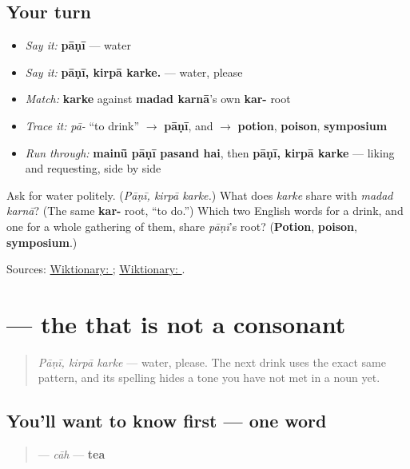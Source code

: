 \subsection*{Your turn}
\begin{itemize}
\raggedright
  \item \emph{Say it:} \textbf{pāṇī} — water
  \item \emph{Say it:} \textbf{pāṇī, kirpā karke.} — water, please
  \item \emph{Match:} \textbf{karke} against \textbf{madad karnā}'s own \textbf{kar-} root
  \item \emph{Trace it:} \emph{pā-} \textquotedblleft{}to drink\textquotedblright{} $\to$ \textbf{pāṇī}, and $\to$ \textbf{potion}, \textbf{poison}, \textbf{symposium}
  \item \emph{Run through:} \textbf{mainū̃ pāṇī pasand hai}, then \textbf{pāṇī, kirpā karke} — liking and requesting, side by side
\end{itemize}

\begin{tcolorbox}[breakable,colback=teal!4,colframe=teal!35!black,title={Before you move on}]
Ask for water politely. (\emph{Pāṇī, kirpā karke.}) What does \emph{karke} share with \emph{madad karnā}? (The same \textbf{kar-} root, \textquotedblleft{}to do.\textquotedblright{}) Which two English words for a drink, and one for a whole gathering of them, share \emph{pāṇī}'s root? (\textbf{Potion}, \textbf{poison}, \textbf{symposium}.)

Sources: \href{https://en.wiktionary.org/wiki/\%E0\%A8\%AA\%E0\%A8\%BE\%E0\%A8\%A3\%E0\%A9\%80}{Wiktionary: }; \href{https://en.wiktionary.org/wiki/\%E0\%A8\%95\%E0\%A8\%BF\%E0\%A8\%B0\%E0\%A8\%AA\%E0\%A8\%BE}{Wiktionary: }.
\end{tcolorbox}
\section[\texorpdfstring{\pa{ਚਾਹ} (cāh)}{ਚਾਹ (cāh)}]{ — the  that is not a consonant}

\label{lesson:PA-C10-chaa}



\begin{quote}
\emph{Pāṇī, kirpā karke} — water, please. The next drink uses the exact same pattern, and its spelling hides a tone you have not met in a noun yet.
\end{quote}

\subsection*{You'll want to know first — one word}
\begin{quote}
\textbf{} — \emph{cāh} — \textbf{tea}
\end{quote}

